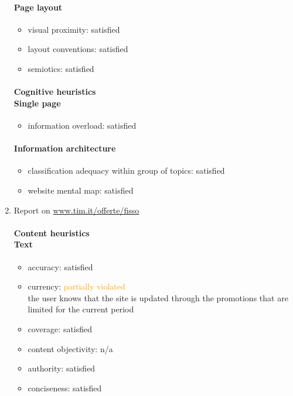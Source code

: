 \begin{enumerate}
	\paragraph*{Page layout}
	\begin{itemize}
		\item visual proximity: satisfied
		\item layout conventions: satisfied
		\item semiotics: satisfied
	\end{itemize}	
	
	\paragraph*{Cognitive heuristics \\ Single page}
	\begin{itemize}
		\item information overload: satisfied
	\end{itemize}	
	
	\paragraph*{Information architecture}
	\begin{itemize}
		\item classification adequacy within group of topics: satisfied
		\item website mental map: satisfied
	\end{itemize}


\item Report on \url{www.tim.it/offerte/fisso}
	\paragraph*{Content heuristics \\ Text}
	\begin{itemize}
		\item accuracy: satisfied
		\item currency: \textcolor{orange}{partially violated}\\
		the user knows that the site is updated through the promotions that are limited for the current period
		\item coverage: satisfied
		\item content objectivity: n/a
		\item authority: satisfied
		\item conciseness: satisfied		
	\end{itemize}


\end{enumerate}
